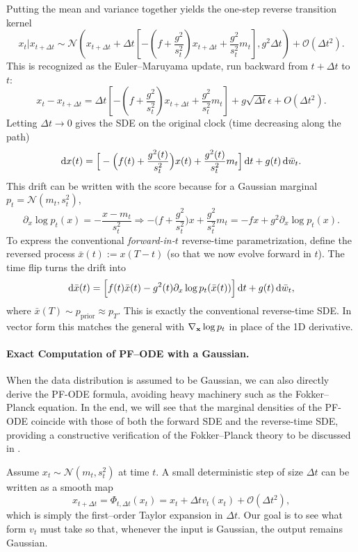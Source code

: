 Putting the mean and variance together yields the one-step reverse transition kernel
\[
x_t    |    x_{t+\Delta t}
 \sim 
\mathcal N\!\left(
x_{t+\Delta t} + \Delta t\!\left[-\left(f+\frac{g^2}{s_t^2}\right)  x_{t+\Delta t} + \frac{g^2}{s_t^2}  m_t\right],
 g^2  \Delta t\right)
 +  \mathcal{O}(\Delta t^2).
\]
This is recognized as the Euler–Maruyama update, run backward from $t+\Delta t$ to $t$:
\[
x_t - x_{t+\Delta t}
= \Delta t\!\left[-\left(f+\frac{g^2}{s_t^2}\right) x_{t+\Delta t} + \frac{g^2}{s_t^2} m_t\right]
+ g\sqrt{\Delta t} \epsilon + O(\Delta t^2).
\]
Letting $\Delta t\to 0$ gives the SDE on the original clock (time decreasing along the path)
\[
\mathop{}\!\mathrm{d} x(t)
= \Big[-\Big(f(t)+\frac{g^2(t)}{s_t^2}\Big) x(t) + \frac{g^2(t)}{s_t^2} m_t\Big]\mathop{}\!\mathrm{d} t
+ g(t) \mathop{}\!\mathrm{d} \bar w_t .
\]
This drift can be written with the score because for a Gaussian marginal $p_t=\mathcal N(m_t,s_t^2)$,
\[
\partial_x \log p_t(x) = -\frac{x-m_t}{s_t^2}
 \Longrightarrow 
-\Big(f+\frac{g^2}{s_t^2}\Big) x + \frac{g^2}{s_t^2} m_t
= -f x + g^2 \partial_x\log p_t(x).
\]
To express the conventional \emph{forward-in-$t$} reverse-time parametrization, define the reversed process $\bar x(t):=x(T-t)$ (so that we now evolve forward in $t$). The time flip turns the drift into
\[
\mathop{}\!\mathrm{d} \bar x(t)
= \Big[ f(t) \bar x(t)  -  g^2(t) \partial_x \log p_t(\bar x(t)) \Big]\mathop{}\!\mathrm{d} t
+ g(t)\mathop{}\!\mathrm{d} \bar w_t,
\]
where $\bar x(T)\sim p_{\mathrm{prior}}\approx p_T$. This is exactly the conventional reverse-time SDE. In vector form this matches the general  with $\nabla_{{\mathbf{x}}}\log p_t$ in place of the 1D derivative.

\paragraph{Exact Computation of PF–ODE with a Gaussian.}
When the data distribution is assumed to be Gaussian, we can also directly derive the PF-ODE formula, avoiding heavy machinery such as the Fokker–Planck equation. In the end, we will see that the marginal densities of the PF-ODE coincide with those of both the forward SDE and the reverse-time SDE, providing a constructive verification of the Fokker–Planck theory to be discussed in .


Assume $x_t\sim\mathcal N(m_t,s_t^2)$ at time $t$. A small deterministic step of size $\Delta t$ can be written as a smooth map
\[
x_{t+\Delta t}=\Phi_{t,\Delta t}(x_t)
= x_t + \Delta t v_t(x_t) + \mathcal{O}(\Delta t^2),
\]
which is simply the first–order Taylor expansion in $\Delta t$. Our goal is to see what form $v_t$ must take so that, whenever the input is Gaussian, the output remains Gaussian.

